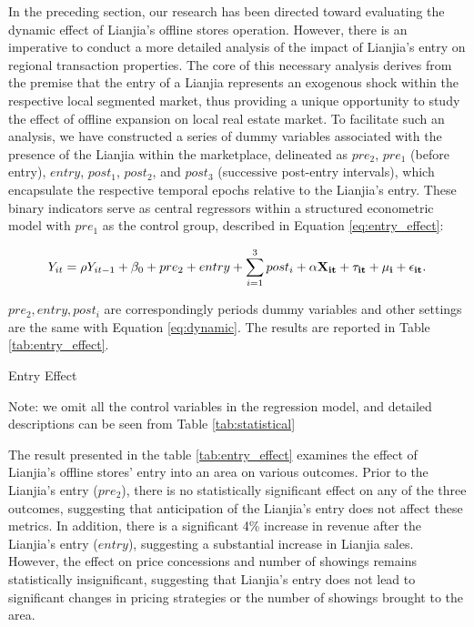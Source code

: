 \documentclass[12pt]{article}
\begin{document}
In the preceding section, our research has been directed toward evaluating the dynamic effect of Lianjia's offline stores operation. However, there is an imperative to conduct a more detailed analysis of the impact of Lianjia's entry on regional transaction properties. The core of this necessary analysis derives from the premise that the entry of a Lianjia represents an exogenous shock within the respective local segmented market, thus providing a unique opportunity to study the effect of offline expansion on local real estate market. To facilitate such an analysis, we have constructed a series of dummy variables associated with the presence of the Lianjia within the marketplace, delineated as $pre_2$, $pre_1$ (before entry), $entry$, $post_1$, $post_2$, and $post_3$ (successive post-entry intervals), which encapsulate the respective temporal epochs relative to the Lianjia's entry. These binary indicators serve as central regressors within a structured econometric model with $pre_1$ as the control group, described in Equation \eqref{eq:entry_effect}:

\begin{equation}
    Y_{it} = \rho Y_{it-1} + \beta_0 +  pre_2 + entry + \sum_{i=1}^3 post_i + \bf{\alpha} \bf{X}_{it} + \tau_{it} + \mu_i + \epsilon_{it}.   \label{eq:entry_effect}
\end{equation}

$pre_2, entry, post_i$ are correspondingly periods dummy variables and other settings are the same with Equation \eqref{eq:dynamic}. The results are reported in Table \ref{tab:entry_effect}.

\begin{table}[htb!]
  \begin{center}
    \begin{scriptsize}
    \caption{Entry Effect}
    \label{tab:entry_effect}
      
    
    Note: we omit all the control variables in the regression model, and detailed descriptions can be seen from Table \ref{tab:statistical}
    \end{scriptsize}
  \end{center}
\end{table}

The result presented in the table \ref{tab:entry_effect} examines the effect of Lianjia's offline stores' entry into an area on various outcomes. Prior to the Lianjia's entry ($pre_2$), there is no statistically significant effect on any of the three outcomes, suggesting that anticipation of the Lianjia's entry does not affect these metrics. In addition, there is a significant 4\% increase in revenue after the Lianjia's entry ($entry$), suggesting a substantial increase in Lianjia sales. However, the effect on price concessions and number of showings remains statistically insignificant, suggesting that Lianjia's entry does not lead to significant changes in pricing strategies or the number of showings brought to the area.
\end{document}
